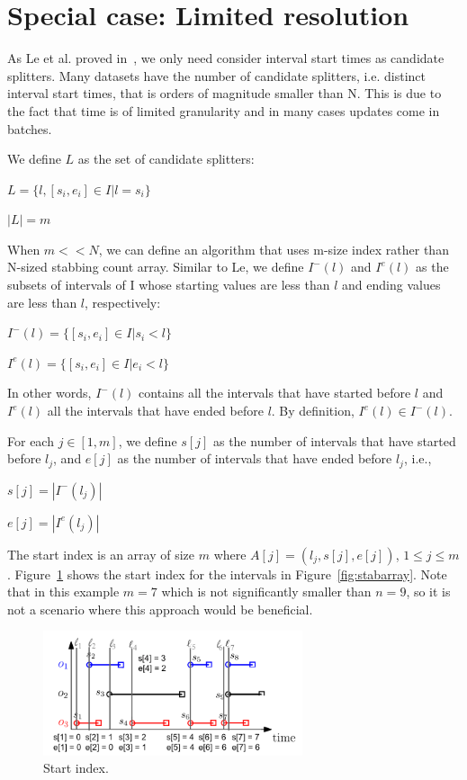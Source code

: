 \section{Special case: Limited resolution}
\label{sec:empirical}

As Le et al. proved in~\cite{Le2013}, we only need consider interval
start times as candidate splitters.  Many datasets have the number of
candidate splitters, i.e. distinct interval start times, that is
orders of magnitude smaller than N. This is due to the fact that time
is of limited granularity and in many cases updates come in
batches. 

We define $L$ as the set of candidate splitters:

$L = \{l, [s_i,e_i] \in I | l = s_i\}$

$|L| = m$

When $m << N$, we can define an algorithm that uses m-size index
rather than N-sized stabbing count array.  Similar to Le, we define
$I^-(l)$ and $I^e(l)$ as the subsets of intervals of I whose starting
values are less than $l$ and ending values are less than $l$,
respectively:

$I^-(l) = \{[s_i,e_i] \in I | s_i < l\}$

$I^e(l) = \{[s_i,e_i] \in I | e_i < l\}$

In other words, $I^-(l)$ contains all the intervals that have started
before $l$ and $I^e(l)$ all the intervals that have ended before $l$.
By definition, $I^e(l) \in I^-(l)$.

For each $j \in [1, m]$, we define $s[j]$ as the number of intervals
that have started before $l_j$, and $e[j]$ as the number of intervals
that have ended before $l_j$, i.e.,

$s[j] = |I^-(l_j)|$

$e[j] = |I^e(l_j)|$

The start index is an array of size $m$ where $A[j] = (l_j, s[j],
e[j])$, $1 \leq j \leq m$.  Figure~\ref{fig:startindex} shows the
start index for the intervals in Figure~\ref{fig:stabarray}.  Note
that in this example $m = 7$ which is not significantly smaller than
$n = 9$, so it is not a scenario where this approach would be
beneficial.

\begin{figure}
\includegraphics[width=3in]{figs/startindex.png}
\caption{Start index.}
\label{fig:startindex}
\end{figure}


